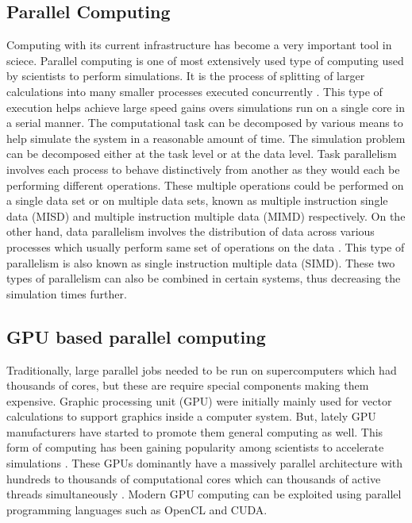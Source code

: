 \documentclass[preprint,10pt,authoryear,review]{elsarticle}
\begin{document}
\begin{linenumbers}
\subsection{Parallel Computing}
Computing with its current infrastructure has become a very important tool in sciece. 
Parallel computing is one of most extensively used type of computing used by scientists 
to perform simulations. It is the process of splitting of larger calculations into 
many smaller processes executed concurrently \citep{Almasi1989}. This type of execution 
helps achieve large speed gains overs simulations run on a single core in a serial manner.
The computational task can be decomposed by various means to help simulate the system 
in a reasonable amount of time. The simulation problem can be decomposed either 
at the task level or at the data level. Task parallelism involves each process to 
behave distinctively from another as they would each be performing different operations. 
These multiple operations could be performed on a single data set or on multiple data 
sets, known as multiple instruction single data (MISD) and multiple instruction 
multiple data (MIMD) respectively. On the other hand, data parallelism 
involves the distribution of data across various processes which usually perform same set of 
operations on the data \citep{solihin2015}. This type of parallelism is also known 
as single instruction multiple data (SIMD). These two types of parallelism can also 
be combined in certain systems, thus decreasing the simulation times further.

\subsection{GPU based parallel computing}
Traditionally, large parallel jobs needed to be run on supercomputers which had thousands 
of cores, but these are require special components making them expensive.
Graphic processing unit (GPU) were initially mainly used for vector calculations to support 
graphics inside a computer system. But, lately GPU manufacturers have started to promote them 
general computing as well. This form of computing has been gaining popularity among scientists 
to accelerate simulations \citep{kandrot2011}. These GPUs dominantly have a 
massively parallel architecture with hundreds to thousands of computational cores 
which can thousands of active threads simultaneously \citep{keckler2011}. 
Modern GPU computing can be exploited using parallel programming languages 
such as OpenCL and CUDA. 


\end{linenumbers}
\end{document}
